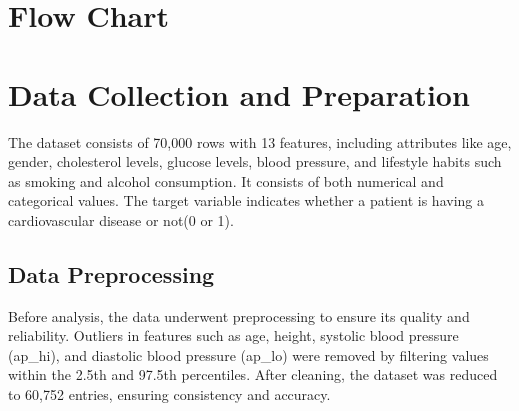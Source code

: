 \documentclass[12pt]{article}
\begin{document}
\section{Flow Chart}
\begin{center}
    

\end{center}
\newpage
\section{Data Collection and Preparation}
The dataset consists of 70,000 rows with 13 features, including attributes like age, gender, cholesterol levels, glucose levels, blood pressure, and lifestyle habits such as smoking and alcohol consumption. It consists of both numerical and categorical values. The target variable indicates whether a patient is having a cardiovascular disease or not(0 or 1).  
\subsection{Data Preprocessing}
Before analysis, the data underwent preprocessing to ensure its quality and reliability. Outliers in features such as age, height, systolic blood pressure (ap\_hi), and diastolic blood pressure (ap\_lo) were removed by filtering values within the 2.5th and 97.5th percentiles. After cleaning, the dataset was reduced to 60,752 entries, ensuring consistency and accuracy.
\end{document}
